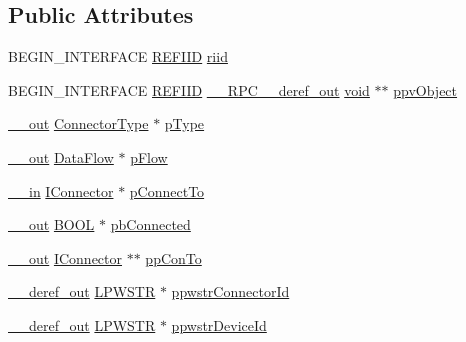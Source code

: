\subsection*{Public Attributes}
\begin{DoxyCompactItemize}
\item 
B\+E\+G\+I\+N\+\_\+\+I\+N\+T\+E\+R\+F\+A\+CE \hyperlink{px__win__ds_8c_a80ec49c8ae61e234197d5071d2df497d}{R\+E\+F\+I\+ID} \hyperlink{struct_i_connector_vtbl_a130cb515391a31ac36c8308765d14e9e}{riid}
\item 
B\+E\+G\+I\+N\+\_\+\+I\+N\+T\+E\+R\+F\+A\+CE \hyperlink{px__win__ds_8c_a80ec49c8ae61e234197d5071d2df497d}{R\+E\+F\+I\+ID} \hyperlink{rpcsal_8h_a23bc188526f10656f9c79d950f6c3192}{\+\_\+\+\_\+\+R\+P\+C\+\_\+\+\_\+deref\+\_\+out} \hyperlink{sound_8c_ae35f5844602719cf66324f4de2a658b3}{void} $\ast$$\ast$ \hyperlink{struct_i_connector_vtbl_a5de0485de0f12318fb7567432c725c37}{ppv\+Object}
\item 
\hyperlink{sal_8h_abb4c3c1135aab6c47cff22e7c16efb74}{\+\_\+\+\_\+out} \hyperlink{devicetopology_8h_a1fd3f2ca684538aaf83c0e6069bb2075}{Connector\+Type} $\ast$ \hyperlink{struct_i_connector_vtbl_ac8ce7d9309d1c05a07c62cb7d2efd94a}{p\+Type}
\item 
\hyperlink{sal_8h_abb4c3c1135aab6c47cff22e7c16efb74}{\+\_\+\+\_\+out} \hyperlink{devicetopology_8h_a1f87b86d9f318bccb8ffaeb8e2600384}{Data\+Flow} $\ast$ \hyperlink{struct_i_connector_vtbl_aee205b802c0845a8b2153531f815b2c6}{p\+Flow}
\item 
\hyperlink{sal_8h_a3f6b8655e1aa9dfc15a9029f0343009e}{\+\_\+\+\_\+in} \hyperlink{devicetopology_8h_a51f898e3bb3480805837711f3fcf328b}{I\+Connector} $\ast$ \hyperlink{struct_i_connector_vtbl_a6f8fb12246cdaf9ff105de6281be8d4e}{p\+Connect\+To}
\item 
\hyperlink{sal_8h_abb4c3c1135aab6c47cff22e7c16efb74}{\+\_\+\+\_\+out} \hyperlink{nfilterkit_8h_a3be13892ae7076009afcf121347dd319}{B\+O\+OL} $\ast$ \hyperlink{struct_i_connector_vtbl_a9a8261edd98f8ee36f8d11ab048645d5}{pb\+Connected}
\item 
\hyperlink{sal_8h_abb4c3c1135aab6c47cff22e7c16efb74}{\+\_\+\+\_\+out} \hyperlink{devicetopology_8h_a51f898e3bb3480805837711f3fcf328b}{I\+Connector} $\ast$$\ast$ \hyperlink{struct_i_connector_vtbl_afe4f6f5bd1675289f3687670ec9196b6}{pp\+Con\+To}
\item 
\hyperlink{sal_8h_a7dec33add44f7afd0eb61b1249a35298}{\+\_\+\+\_\+deref\+\_\+out} \hyperlink{mapinls_8h_acc28f72b93422cfd63a60e5a102a77b1}{L\+P\+W\+S\+TR} $\ast$ \hyperlink{struct_i_connector_vtbl_a328e9302de134490233ed45553bb2a12}{ppwstr\+Connector\+Id}
\item 
\hyperlink{sal_8h_a7dec33add44f7afd0eb61b1249a35298}{\+\_\+\+\_\+deref\+\_\+out} \hyperlink{mapinls_8h_acc28f72b93422cfd63a60e5a102a77b1}{L\+P\+W\+S\+TR} $\ast$ \hyperlink{struct_i_connector_vtbl_ab039c22ccf7076e5e9d8f3a79ff796ce}{ppwstr\+Device\+Id}
\end{DoxyCompactItemize}


